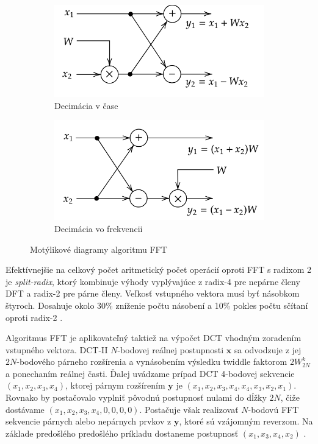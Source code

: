 \begin{figure}[h]
\centering
\begin{subfigure}[b]{0.48\textwidth}
    \centering
    \includegraphics[width=\textwidth]{figures/analysis/dit-butterfly.png}
    \caption{Decimácia v čase}
    \label{fig:dit-butterfly}
\end{subfigure}
\hfill
\begin{subfigure}[b]{0.48\textwidth}
    \centering
    \includegraphics[width=\textwidth]{figures/analysis/dif-butterfly.png}
    \caption{Decimácia vo frekvencii}
    \label{fig:dif-butterfly}
\end{subfigure}
\caption{Motýlikové diagramy algoritmu FFT}
\end{figure}

Efektívnejšie na celkový počet aritmetický počet operácií oproti FFT s radixom 2 je \emph{split-radix}, ktorý
kombinuje výhody vyplývajúce z radix-4 pre nepárne členy DFT a radix-2 pre párne členy. Veľkosť vstupného
vektora musí byť násobkom štyroch. Dosahuje okolo 30\% zníženie počtu násobení a 10\% pokles počtu sčítaní
oproti radix-2 \cite{split-radix}.

Algoritmus FFT je aplikovateľný taktiež na výpočet DCT vhodným zoradením vstupného vektora. DCT-II $N$-bodovej
reálnej postupnosti $\mathbf{x}$ sa odvodzuje z jej $2N$-bodového párneho rozšírenia a vynásobením výsledku
twiddle faktorom $2W_{2N}^{k}$ a ponechaním reálnej časti. Ďalej uvádzame prípad
DCT 4-bodovej sekvencie $(x_1, x_2, x_3, x_4)$, ktorej párnym rozšírením $\mathbf{y}$ je
$(x_1, x_2, x_3, x_4, x_4, x_3, x_2, x_1)$.
Rovnako by postačovalo vyplniť pôvodnú postupnosť nulami do dĺžky $2N$, čiže dostávame $(x_1, x_2, x_3, x_4, 0, 0, 0, 0)$.
Postačuje však realizovať $N$-bodovú FFT sekvencie párnych alebo nepárnych prvkov z $\mathbf{y}$, ktoré sú vzájomným reverzom.
Na základe predošlého predošlého príkladu dostaneme postupnosť $(x_1, x_3, x_4, x_2)$ \cite{fast-dct}.

